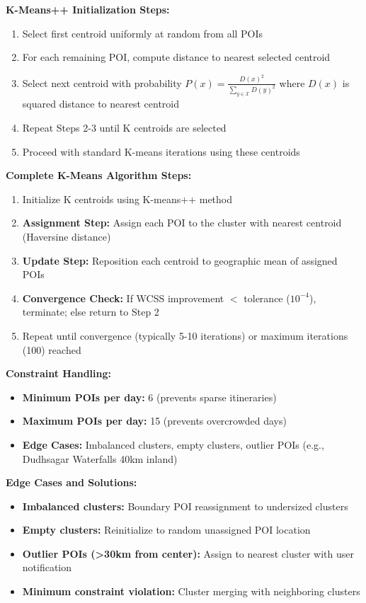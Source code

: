 \textbf{K-Means++ Initialization Steps:}
\begin{enumerate}
    \item Select first centroid uniformly at random from all POIs
    \item For each remaining POI, compute distance to nearest selected centroid
    \item Select next centroid with probability $P(x) = \frac{D(x)^2}{\sum_{y \in \mathcal{X}} D(y)^2}$ where $D(x)$ is squared distance to nearest centroid
    \item Repeat Steps 2-3 until K centroids are selected
    \item Proceed with standard K-means iterations using these centroids
\end{enumerate}

\textbf{Complete K-Means Algorithm Steps:}
\begin{enumerate}
    \item Initialize K centroids using K-means++ method
    \item \textbf{Assignment Step:} Assign each POI to the cluster with nearest centroid (Haversine distance)
    \item \textbf{Update Step:} Reposition each centroid to geographic mean of assigned POIs
    \item \textbf{Convergence Check:} If WCSS improvement $<$ tolerance ($10^{-4}$), terminate; else return to Step 2
    \item Repeat until convergence (typically 5-10 iterations) or maximum iterations (100) reached
\end{enumerate}

\textbf{Constraint Handling:}
\begin{itemize}
    \item \textbf{Minimum POIs per day:} 6 (prevents sparse itineraries)
    \item \textbf{Maximum POIs per day:} 15 (prevents overcrowded days)
    \item \textbf{Edge Cases:} Imbalanced clusters, empty clusters, outlier POIs (e.g., Dudhsagar Waterfalls 40km inland)
\end{itemize}

\textbf{Edge Cases and Solutions:}
\begin{itemize}
    \item \textbf{Imbalanced clusters:} Boundary POI reassignment to undersized clusters
    \item \textbf{Empty clusters:} Reinitialize to random unassigned POI location
    \item \textbf{Outlier POIs (>30km from center):} Assign to nearest cluster with user notification
    \item \textbf{Minimum constraint violation:} Cluster merging with neighboring clusters
\end{itemize}

